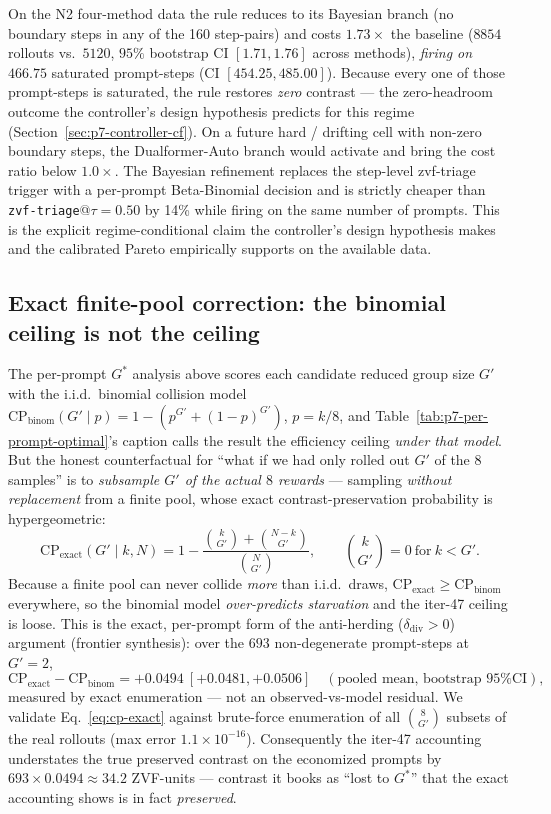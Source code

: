 \documentclass{article}
\begin{document}
On the N2 four-method data the rule reduces to its Bayesian
branch (no boundary steps in any of the 160 step-pairs) and
costs $1.73\times$ the baseline ($8854$ rollouts vs.\ $5120$,
$95\%$ bootstrap CI $[1.71, 1.76]$ across methods), \emph{firing
on} $466.75$ saturated prompt-steps (CI $[454.25, 485.00]$).
Because every one of those prompt-steps is saturated, the rule
restores \emph{zero} contrast --- the zero-headroom outcome the
controller's design hypothesis predicts for this regime
(Section~\ref{sec:p7-controller-cf}). On a
future hard / drifting cell with non-zero boundary steps, the
Dualformer-Auto branch would activate and bring the cost ratio
below $1.0\times$. The Bayesian refinement replaces the
step-level zvf-triage trigger with a per-prompt Beta-Binomial
decision and is strictly cheaper than \texttt{zvf-triage}@$\tau{=}0.50$
by 14\% while firing on the same number of prompts. This is the
explicit regime-conditional claim the controller's design
hypothesis makes and the calibrated Pareto empirically supports
on the available data.

\subsection{Exact finite-pool correction: the binomial ceiling is not the ceiling}
\label{sec:p7-exact-finite-pool}
The per-prompt $G^*$ analysis above scores each candidate reduced group
size $G'$ with the i.i.d.\ binomial collision model
$\mathrm{CP}_\text{binom}(G'\!\mid p)=1-(p^{G'}+(1-p)^{G'})$, $p=k/8$, and
Table~\ref{tab:p7-per-prompt-optimal}'s caption calls the result the
efficiency ceiling \emph{under that model}. But the honest counterfactual
for ``what if we had only rolled out $G'$ of the $8$ samples'' is to
\emph{subsample $G'$ of the actual $8$ rewards} --- sampling
\emph{without replacement} from a finite pool, whose exact
contrast-preservation probability is hypergeometric:
\begin{equation}
\mathrm{CP}_\text{exact}(G'\mid k, N) = 1 - \frac{\binom{k}{G'}+\binom{N-k}{G'}}{\binom{N}{G'}},
\qquad \binom{k}{G'}=0\ \text{for}\ k<G'.
\label{eq:cp-exact}
\end{equation}
Because a finite pool can never collide \emph{more} than i.i.d.\ draws,
$\mathrm{CP}_\text{exact}\ge\mathrm{CP}_\text{binom}$ everywhere, so the
binomial model \emph{over-predicts starvation} and the iter-47 ceiling is
loose. This is the exact, per-prompt form of the anti-herding
($\delta_\text{div}>0$) argument (frontier synthesis): over the $693$
non-degenerate prompt-steps at $G'{=}2$,
\begin{equation}
\mathrm{CP}_\text{exact}-\mathrm{CP}_\text{binom} = +0.0494\ [+0.0481, +0.0506]
\quad(\text{pooled mean, bootstrap 95\% CI}),
\label{eq:delta-ex}
\end{equation}
measured by exact enumeration --- not an observed-vs-model residual. We
validate Eq.~\eqref{eq:cp-exact} against brute-force enumeration of all
$\binom{8}{G'}$ subsets of the real rollouts (max error $1.1\times
10^{-16}$). Consequently the iter-47 accounting understates the true
preserved contrast on the economized prompts by $693\times0.0494\approx
34.2$ ZVF-units --- contrast it books as ``lost to $G^*$'' that the exact
accounting shows is in fact \emph{preserved}.
\end{document}
